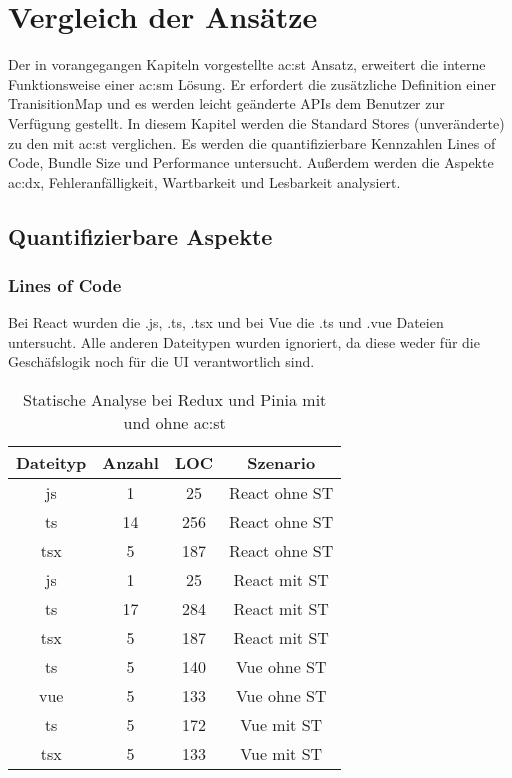 \chapter{Vergleich der Ansätze} \label{vergleich}

Der in vorangegangen Kapiteln vorgestellte \acrlong{ac:st} Ansatz, erweitert die interne Funktionsweise einer \acrlong{ac:sm} Lösung. Er erfordert die zusätzliche Definition einer TranisitionMap und es werden leicht geänderte APIs dem Benutzer zur Verfügung gestellt. In diesem Kapitel werden die Standard Stores (unveränderte) zu den mit \acrlong{ac:st} verglichen. Es werden die quantifizierbare Kennzahlen Lines of Code, Bundle Size und Performance untersucht. Außerdem werden die Aspekte \acrlong{ac:dx}, Fehleranfälligkeit, Wartbarkeit und Lesbarkeit analysiert.

\section{Quantifizierbare Aspekte}
\subsection{Lines of Code}

Bei React wurden die .js, .ts, .tsx und bei Vue die .ts und .vue Dateien untersucht. Alle anderen Dateitypen wurden ignoriert, da diese weder für die Geschäfslogik noch für die UI verantwortlich sind.

\begin{table}[!ht]
  \caption{Statische Analyse bei Redux und Pinia mit und ohne \acrshort{ac:st}}
  \label{tab:staticAnalysisSTvsNoST}

  \begin{center}
    \begin{tabular}{|c|c|c|c|} 
    \hline
    Dateityp & Anzahl & LOC & Szenario \\ [0.5ex] 
    \hline\hline
    js & 1 & 25 & React ohne ST \\ 
    \hline
    ts & 14 & 256 & React ohne ST \\
    \hline
    tsx & 5 & 187 & React ohne ST \\
    \hline\hline
    js & 1 & 25 & React mit ST \\ 
    \hline
    ts & 17 & 284 & React mit ST \\
    \hline
    tsx & 5 & 187 & React mit ST \\
    \hline\hline
    ts & 5 & 140 & Vue ohne ST \\
    \hline
    vue & 5 & 133 & Vue ohne ST \\
    \hline\hline
    ts & 5 & 172 & Vue mit ST \\
    \hline
    tsx & 5 & 133 & Vue mit ST \\
    \hline
    \end{tabular}
  \end{center}
\end{table}

